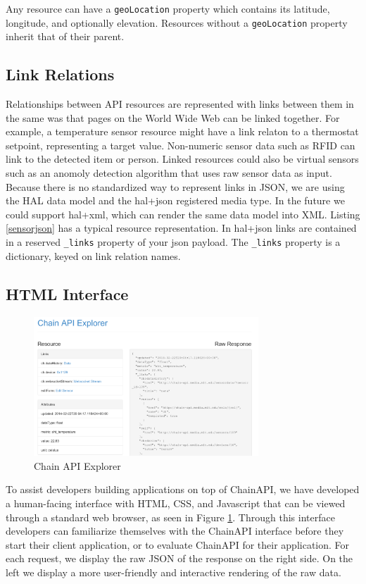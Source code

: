 \documentclass{acm_proc_article-sp}
\begin{document}
Any resource can have a \texttt{geoLocation} property which contains its
latitude, longitude, and optionally elevation. Resources without a
\texttt{geoLocation} property inherit that of their parent.

\subsection{Link Relations}

Relationships between API resources are represented with links between them in
the same was that pages on the World Wide Web can be linked together. For
example, a temperature sensor resource might have a link relaton to a
thermostat setpoint, representing a target value. Non-numeric sensor data such
as RFID can link to the detected item or person. Linked resources could also be
virtual sensors such as an anomoly detection algorithm that uses raw sensor
data as input. Because there is no standardized way to represent links in JSON,
we are using the HAL data model and the hal+json registered media type. In the
future we could support hal+xml, which can render the same data model into XML.
Listing \ref{sensorjson} has a typical resource representation. In hal+json
links are contained in a reserved \texttt{\_links} property of your json
payload. The \texttt{\_links} property is a dictionary, keyed on link relation
names.

\subsection{HTML Interface}

\begin{figure}
    \centering
    \includegraphics[width=8.45cm, frame]{chain_explorer2}
    \caption{Chain API Explorer}
    \label{chain_explorer}
\end{figure}

To assist developers building applications on top of ChainAPI, we have
developed a human-facing interface with HTML, CSS, and Javascript that can be
viewed through a standard web browser, as seen in Figure \ref{chain_explorer}.
Through this interface developers can familiarize themselves with the ChainAPI
interface before they start their client application, or to evaluate ChainAPI
for their application. For each request, we display the raw JSON of the
response on the right side. On the left we display a more user-friendly and
interactive rendering of the raw data.
\end{document}
